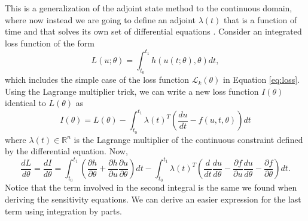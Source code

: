 

This is a generalization of the adjoint state method to the continuous domain, where now instead we are going to define an adjoint $\lambda(t)$ that is a function of time and that solves its own set of differential equations \cite{ma_comparison_2021}. %
Consider an integrated loss function of the form 
\begin{equation}
    L(u; \theta) = \int_{t_0}^{t_1} h(u(t;\theta), \theta) dt,
\end{equation}
which includes the simple case of the loss function $\mathcal L_k(\theta)$ in Equation \eqref{eq:loss}. 
Using the Lagrange multiplier trick, we can write a new loss function $I(\theta)$ identical to $L(\theta)$ as 
\begin{equation}
    I(\theta) = L(\theta) - \int_{t_0}^{t_1} \lambda(t)^T \left( \frac{du}{dt} - f(u, t, \theta) \right) dt
\end{equation}
where $\lambda(t) \in \mathbb R^n$ is the Lagrange multiplier of the continuous constraint defined by the differential equation. Now, 
\begin{equation}
    \frac{dL}{d\theta} = \frac{dI}{d\theta} = 
    \int_{t_0}^{t_1} \left( \frac{\partial h}{\partial \theta} + \frac{\partial h}{\partial u} \frac{\partial u}{\partial \theta} \right) dt
    - 
    \int_{t_0}^{t_1} \lambda(t)^T \left( \frac{d}{dt} \frac{du}{d\theta} - \frac{\partial f}{\partial u} \frac{du}{d\theta} - \frac{\partial f}{\partial \theta} \right) dt.
\end{equation}
Notice that the term involved in the second integral is the same we found when deriving the sensitivity equations. 
We can derive an easier expression for the last term using integration by parts. 
